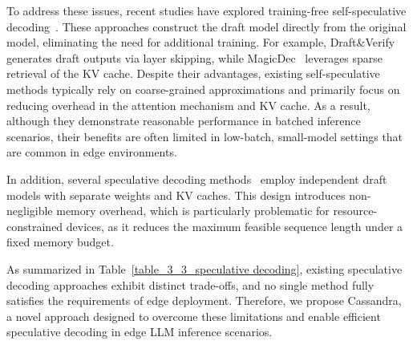 To address these issues, recent studies have explored training-free self-speculative decoding~\cite{Draft&Verify, QuantSpec, MagicDec}. These approaches construct the draft model directly from the original model, eliminating the need for additional training. For example, Draft\&Verify~\cite{Draft&Verify} generates draft outputs via layer skipping, while MagicDec~\cite{MagicDec} leverages sparse retrieval of the KV cache. Despite their advantages, existing self-speculative methods typically rely on coarse-grained approximations and primarily focus on reducing overhead in the attention mechanism and KV cache. As a result, although they demonstrate reasonable performance in batched inference scenarios, their benefits are often limited in low-batch, small-model settings that are common in edge environments.

In addition, several speculative decoding methods~\cite{speculativesampling, eagle3} employ independent draft models with separate weights and KV caches. This design introduces non-negligible memory overhead, which is particularly problematic for resource-constrained devices, as it reduces the maximum feasible sequence length under a fixed memory budget.

As summarized in Table~\ref{table_3_3_speculative decoding}, existing speculative decoding approaches exhibit distinct trade-offs, and no single method fully satisfies the requirements of edge deployment. Therefore, we propose Cassandra, a novel approach designed to overcome these limitations and enable efficient speculative decoding in edge LLM inference scenarios.



